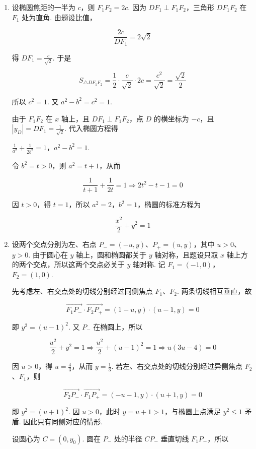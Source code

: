 \begin{solution}
\begin{enumerate}
\item 设椭圆焦距的一半为 \(c\)，则 \(F_1F_2=2c\). 因为 \(DF_1\perp F_1F_2\)，三角形 \(DF_1F_2\) 在 \(F_1\) 处为直角. 由题设比值，

\[
\frac{2c}{DF_1}=2\sqrt2
\]

得 \(DF_1=\frac{c}{\sqrt2}\). 于是

\[
S_{\triangle DF_1F_2}
=\frac12\cdot\frac{c}{\sqrt2}\cdot2c
=\frac{c^2}{\sqrt2}
=\frac{\sqrt2}{2}
\]

所以 \(c^2=1\). 又 \(a^2-b^2=c^2=1\).

由于 \(F_1F_2\) 在 \(x\) 轴上，且 \(DF_1\perp F_1F_2\)，点 \(D\) 的横坐标为 \(-c\)，且 \(|y_D|=DF_1=\frac1{\sqrt2}\). 代入椭圆方程得

\(\frac1{a^2}+\frac1{2b^2}=1\)，\(a^2-b^2=1\).

令 \(b^2=t>0\)，则 \(a^2=t+1\)，从而

\[
\frac1{t+1}+\frac1{2t}=1
\Longrightarrow 2t^2-t-1=0
\]

因 \(t>0\)，得 \(t=1\)，所以 \(a^2=2\)，\(b^2=1\)，椭圆的标准方程为

\[
\frac{x^2}{2}+y^2=1
\]

\item 设两个交点分别为左、右点 \(P_{-}=(-u,y)\)、\(P_{+}=(u,y)\)，其中 \(u>0\)、\(y>0\). 由于圆心在 \(y\) 轴上，圆和椭圆都关于 \(y\) 轴对称，且题设只取 \(x\) 轴上方的两个交点，所以这两个交点必关于 \(y\) 轴对称. 记 \(F_1=(-1,0)\)，\(F_2=(1,0)\).

先考虑左、右交点处的切线分别经过同侧焦点 \(F_1\)、\(F_2\). 两条切线相互垂直，故

\[
\overrightarrow{F_1P_{-}}\cdot\overrightarrow{F_2P_{+}}
=(1-u,y)\cdot(u-1,y)=0
\]

即 \(y^2=(u-1)^2\). 又 \(P_{-}\) 在椭圆上，所以

\[
\frac{u^2}{2}+y^2=1
\Longrightarrow \frac{u^2}{2}+(u-1)^2=1
\Longrightarrow u(3u-4)=0
\]

因 \(u>0\)，得 \(u=\frac43\)，从而 \(y=\frac13\). 若左、右交点处的切线分别经过异侧焦点 \(F_2\)、\(F_1\)，则

\[
\overrightarrow{F_2P_{-}}\cdot\overrightarrow{F_1P_{+}}
=(-u-1,y)\cdot(u+1,y)=0
\]

即 \(y^2=(u+1)^2\). 因 \(u>0\)，此时 \(y=u+1>1\)，与椭圆上点满足 \(y^2\leqslant1\) 矛盾. 因此只有同侧对应的情形.

设圆心为 \(C=(0,y_0)\). 圆在 \(P_{-}\) 处的半径 \(CP_{-}\) 垂直切线 \(F_1P_{-}\)，所以


\end{enumerate}
\end{solution}
